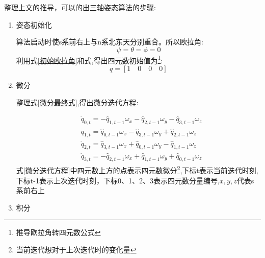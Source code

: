 \documentclass[12pt,a4paper]{article}
\begin{document}
整理上文的推导，可以的出三轴姿态算法的步骤:
\begin{enumerate}
    \item 姿态初始化

        算法启动时使s系前右上与n系北东天分别重合。所以欧拉角:
        \begin{equation}\label{初始欧拉角}
            \psi = \theta = \phi = 0
        \end{equation}
        利用式\ref{初始欧拉角}和式,得出四元数初始值为\footnote{推导欧拉角转四元数公式}:
        \begin{equation}
            q=[1\quad 0\quad 0\quad 0] \label{分量四元数}
        \end{equation}
    \item 微分

        整理式\ref{微分最终式},得出微分迭代方程:

        \begin{equation} \label{微分迭代方程}
            \begin{aligned} 
                &\dot{q}_{0,t} = -\hat{q}_{1,t-1} \omega_x - \hat{q}_{2,t-1} \omega_y - \hat{q}_{3,t-1} \omega_z \\
                &\dot{q}_{1,t} =  \hat{q}_{0,t-1} \omega_x - \hat{q}_{3,t-1} \omega_y + \hat{q}_{2,t-1} \omega_z \\
                &\dot{q}_{2,t} =  \hat{q}_{3,t-1} \omega_x + \hat{q}_{0,t-1} \omega_y - \hat{q}_{1,t-1} \omega_z \\
                &\dot{q}_{3,t} = -\hat{q}_{2,t-1} \omega_x + \hat{q}_{1,t-1} \omega_y + \hat{q}_{0,t-1} \omega_z
            \end{aligned}
        \end{equation} 
        式\ref{微分迭代方程}中四元数上方的点表示四元数微分\footnote{当前迭代想对于上次迭代时的变化量},下标t表示当前迭代时刻,下标t-1表示上次迭代时刻，下标0、1、2、3表示四元数分量编号,$x,y,z$代表s系前右上
    \item 积分


\end{enumerate}
\end{document}
